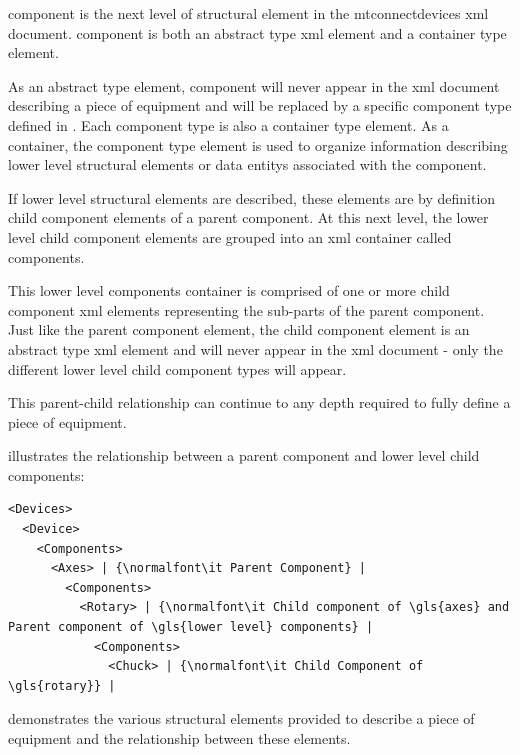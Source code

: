 \documentclass{mtconnect}	%
\begin{document}
\gls{component} is the next level of \gls{structural element} in the \gls{mtconnectdevices} \gls{xml} document. \gls{component} is both an abstract type \gls{xml} element and a container type element. 

As an abstract type element, \gls{component} will never appear in the \gls{xml} document describing a piece of equipment and will be replaced by a specific \gls{component} type defined in . Each \gls{component} type is also a container type element. As a container, the \gls{component} type element is used to organize information describing \gls{lower level} \glspl{structural element} or \glspl{data entity} associated with the \gls{component}.

If \gls{lower level} \glspl{structural element} are described, these elements are by definition child \gls{component} elements of a parent \gls{component}. At this next level, the \gls{lower level} child \gls{component} elements are grouped into an \gls{xml} container called \gls{components}.

This \gls{lower level} \gls{components} container is comprised of one or more child \gls{component} \gls{xml} elements representing the sub-parts of the parent \gls{component}. Just like the parent \gls{component} element, the child \gls{component} element is an abstract type \gls{xml} element and will never appear in the \gls{xml} document - only the different \gls{lower level} child \gls{component} types will appear.

This parent-child relationship can continue to any depth required to fully define a piece of equipment.

 illustrates the relationship between a parent \gls{component} and \gls{lower level} child components:

\begin{lstlisting}[firstnumber=1,escapechar=|,%
    caption={Component Levels},label={lst:component-levels}]
<Devices>
  <Device>
    <Components>
      <Axes> | {\normalfont\it Parent Component} |
        <Components>
          <Rotary> | {\normalfont\it Child component of \gls{axes} and Parent component of \gls{lower level} components} |
            <Components>
              <Chuck> | {\normalfont\it Child Component of \gls{rotary}} |
\end{lstlisting}

 demonstrates the various \glspl{structural element} provided to describe a piece of equipment and the relationship between these elements.
\end{document}
